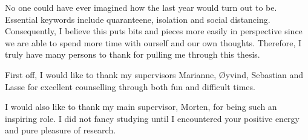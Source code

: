 No one could have ever imagined how the last year would turn out to be. Essential keywords include quaranteene, isolation and social distancing. Consequently, I believe this puts bits and pieces more easily in perspective since we are able to spend more time with ourself and our own thoughts. Therefore, I truly have many persons to thank for pulling me through this thesis.

First off, I would like to thank my supervisors Marianne, Øyvind, Sebastian and Lasse for excellent counselling through both fun and difficult times.

I would also like to thank my main supervisor, Morten, for being such an inspiring role. I did not fancy studying until I encountered your positive energy and pure pleasure of research. 
